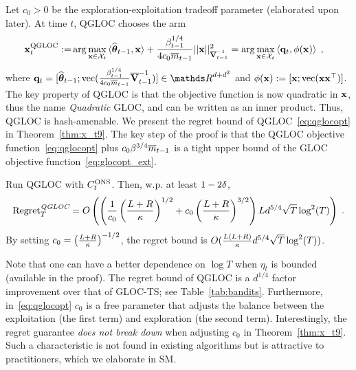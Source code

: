 Let $c_0 > 0$ be the exploration-exploitation tradeoff parameter (elaborated upon later).
At time $t$, QGLOC chooses the arm
\begin{equation}\begin{aligned}    \label{eq:qglocopt} 
  \mathbf{x}_{t}^{{\text{\normalfont QGLOC}}} :=&  \arg \max_{\mathbf{x}\in{\mathcal X}_t} {\langle} \widehat{\boldsymbol\theta}_{t-1}, \mathbf{x} {\rangle}  + { \frac{\beta_{t-1}^{1/4}}{4 c_0 \overline{m}_{t-1}} } || \mathbf{x} ||^2_{\overline{\mathbf{V}}^{-1}_{t-1}} 
= \arg \max_{\mathbf{x}\in\mathcal{X}_t} \left\langle {{\mathbf q}}_t,  \phi(\mathbf{x}) \right\rangle \;, 
\end{aligned}\end{equation}
where $\q_t = [ \hth_{t-1}; \vec( \fr{\beta^{1/4}_{t-1} }{4c_0\barm_{t-1}} \ibarV_{t-1} )] \in \dsR^{d+d^2}$ and $\phi(\mathbf{x}) := [\mathbf{x}; {\text{vec}}(\mathbf{x}\mathbf{x}^{\top})]$.
The key property of QGLOC is that the objective function is now quadratic in $\mathbf{x}$, thus the name \emph{Quadratic} GLOC, and can be written as an inner product.
Thus, QGLOC is hash-amenable.
We present the regret bound of QGLOC~\eqref{eq:qglocopt} in Theorem~\ref{thm:x_t9}.
The key step of the proof is that the QGLOC objective function~\eqref{eq:qglocopt} plus $c_0\beta^{3/4} \overline{m}_{t-1}$ is a tight upper bound of the GLOC objective function~\eqref{eq:glocopt_ext}.
\begin{thm}\label{thm:x_t9}
  Run QGLOC with $C^{{\text{\normalfont ONS}}}_t$.
  Then, w.p. at least $1-2{\delta}$,
  \[
    \normalfont{\text{Regret}}_T^{\emph{\text{QGLOC}}} = O\left(  \left({ \frac{1}{c_0} }\left( { \frac{L+R}{{\kappa}} } \right)^{1/2} + c_0\left( { \frac{L+R}{{\kappa}} } \right)^{3/2} \right) Ld^{5/4} \sqrt{T} \log^2(T)\right)\;.
    \]
   By setting $c_0 = \left( { \frac{L+R}{{\kappa}} } \right)^{-1/2}$, the regret bound is $O({ \frac{L(L+R)}{{\kappa}} } d^{5/4} \sqrt{T} \log^2(T)) $.
\end{thm}
Note that one can have a better dependence on $\log T$ when $\eta_t$ is bounded (available in the proof).
The regret bound of QGLOC is a $d^{1/4}$ factor improvement over that of GLOC-TS; see Table~\ref{tab:bandits}.
Furthermore, in~\eqref{eq:qglocopt} $c_0$ is a free parameter that adjusts the balance between the exploitation (the first term) and exploration (the second term).
Interestingly, the regret guarantee \emph{does not break down} when adjusting $c_0$ in Theorem~\ref{thm:x_t9}.
Such a characteristic is not found in existing algorithms but is attractive to practitioners, which we elaborate in SM.

